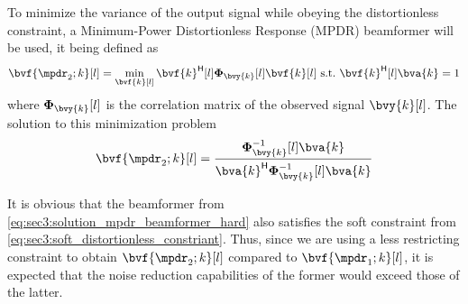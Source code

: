 To minimize the variance of the output signal while obeying the distortionless constraint, a Minimum-Power Distortionless Response (MPDR) beamformer will be used, it being defined as
\begin{equation}
	\label{eq:sec3:minimization_problem_mpdr_soft}
	\bvf{\mpdr_2;k}[l] = \min_{\bvf{k}[l]} \he{\bvf{k}}[l] \Corr{\bvy{k}}[l] \bvf{k}[l]~\text{s.t.}~\he{\bvf{k}}[l] \bva{k} = 1
\end{equation}
where $\Corr{\bvy{k}}[l]$ is the correlation matrix of the observed signal $\bvy{k}[l]$. The solution to this minimization problem 
\begin{equation}
	\label{eq:sec3:solution_mpdr_beamformer_soft}
	\bvf{\mpdr_2;k}[l] = \frac{\iCorr{\bvy{k}}[l] \bva{k}}{ \he{\bva{k}} \iCorr{\bvy{k}}[l] \bva{k} }
\end{equation}

It is obvious that the beamformer from \cref{eq:sec3:solution_mpdr_beamformer_hard} also satisfies the soft constraint from \cref{eq:sec3:soft_distortionless_constriant}. Thus, since we are using a less restricting constraint to obtain $\bvf{\mpdr_2;k}[l]$ compared to $\bvf{\mpdr_1;k}[l]$, it is expected that the noise reduction capabilities of the former would exceed those of the latter.